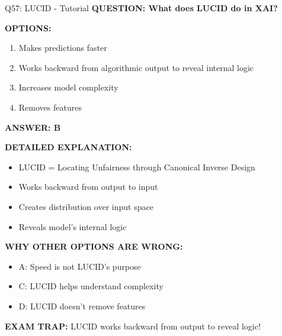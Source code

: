\documentclass[8pt]{beamer}
\begin{document}
	\begin{frame}{Q57: LUCID - Tutorial}
		\fontsize{6.5}{7.5}\selectfont
		\textbf{QUESTION: What does LUCID do in XAI?}
		
		\vspace{0.1cm}
		\textbf{OPTIONS:}
		\begin{enumerate}
			\item Makes predictions faster
			\item Works backward from algorithmic output to reveal internal logic
			\item Increases model complexity
			\item Removes features
		\end{enumerate}
		
		\vspace{0.1cm}
		\textcolor{myblue}{\textbf{ANSWER: B}}
		
		\vspace{0.1cm}
		\textbf{DETAILED EXPLANATION:}
		\begin{itemize}
			\item LUCID = Locating Unfairness through Canonical Inverse Design
			\item Works backward from output to input
			\item Creates distribution over input space
			\item Reveals model's internal logic
		\end{itemize}
		
		\vspace{0.1cm}
		\textcolor{myred}{\textbf{WHY OTHER OPTIONS ARE WRONG:}}
		\begin{itemize}
			\item \textcolor{myred}{A:} Speed is not LUCID's purpose
			\item \textcolor{myred}{C:} LUCID helps understand complexity
			\item \textcolor{myred}{D:} LUCID doesn't remove features
		\end{itemize}
		
		\textcolor{myred}{\textbf{EXAM TRAP:}} LUCID works \textcolor{myblue}{backward from output to reveal logic}!
	\end{frame}
	
\end{document}
